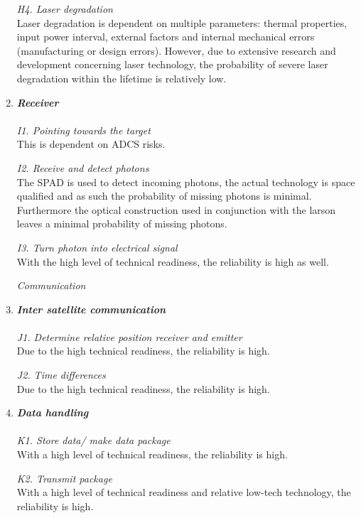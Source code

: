 \begin{enumerate}[A]
\textit{H4. Laser degradation}\\
Laser degradation is dependent on multiple parameters: thermal properties, input power interval, external factors and internal mechanical errors (manufacturing or design errors). However, due to extensive research and development concerning laser technology, the probability of severe laser degradation within the lifetime is relatively low. 

	\item\textbf{\textit{Receiver}} \\\\
\textit{I1. Pointing towards the target} \\
This is dependent on ADCS risks.

\textit{I2. Receive and detect photons}\\ 
The \ac{SPAD} is used to detect incoming photons, the actual technology is space qualified and as such the probability of missing photons is minimal. Furthermore the optical construction used in conjunction with the \acs{larson} leaves a minimal probability of missing photons. 

\textit{I3. Turn photon into electrical signal}\\ 
With the high level of technical readiness, the reliability is high as well.

\begin{description}
\item[\textit{Communication}]
\end{description}
	\item\textbf{\textit{Inter satellite communication}} \\\\
\textit{J1. Determine relative position receiver and emitter}\\ 
Due to the high technical readiness, the reliability is high.

\textit{J2. Time differences}\\ 
Due to the high technical readiness, the reliability is high.

	\item\textbf{\textit{Data handling}} \\\\
\textit{K1. Store data/ make data package}\\ 
With a high level of technical readiness, the reliability is high.

\textit{K2. Transmit package}\\ 
With a high level of technical readiness and relative low-tech technology, the reliability is high.


\end{enumerate}

